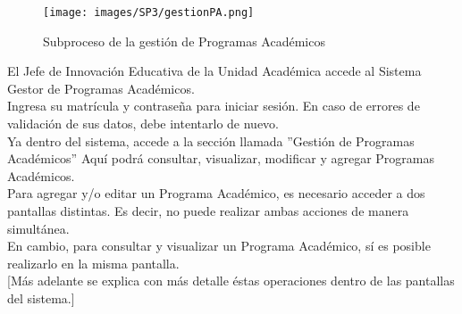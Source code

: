         \begin{figure}[!hbtp]
        	\centering
        	\hypertarget{BPMNGPA}{\texttt{[image: images/SP3/gestionPA.png]}}
        	\caption{Subproceso de la gestión de Programas Académicos}
        	\label{BPMNGPA}
        \end{figure}
        
        El Jefe de Innovación Educativa de la Unidad Académica accede al Sistema Gestor de Programas Académicos.\\
        
        Ingresa su matrícula y contraseña para iniciar sesión. En caso de errores de validación de sus datos, debe intentarlo de nuevo.\\
        
        Ya dentro del sistema, accede a la sección llamada ''Gestión de Programas Académicos'' Aquí podrá consultar, visualizar, modificar y agregar Programas Académicos. \\
        
        Para agregar y/o editar un Programa Académico, es necesario acceder a dos pantallas distintas. Es decir, no puede realizar ambas acciones de manera simultánea.\\
        
        En cambio, para consultar y visualizar  un Programa Académico, sí es posible realizarlo en la misma pantalla.\\
        
        [Más adelante se explica con más detalle éstas operaciones dentro de las pantallas del sistema.]\\
        
        

